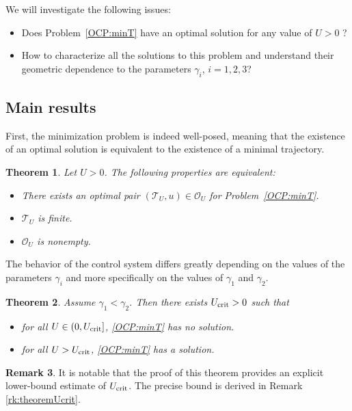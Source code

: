 \documentclass[JEP,XML,SOM,Unicode,NoEqCountersInSection,NoFloatCountersInSection,published]{cedram}
\newtheorem{theorem}{Theorem}
\theoremstyle{definition}
\newtheorem{remark}[theorem]{Remark}
\begin{document}
We will investigate the following issues:
\begin{itemize}
\item Does Problem~\eqref{OCP:minT} have an optimal solution for any value of $U >0$ ?
\item How to characterize all the solutions to this problem and understand their geometric dependence to the parameters $\gamma_i$, $i=1,2,3$?
\end{itemize}

\subsection{Main results}\label{sec:mainRes}

First, the minimization problem is indeed well-posed, meaning that the existence of an optimal solution is equivalent to the existence of a minimal trajectory.

\begin{theorem} \label{th:ex_min}
Let $U > 0$. The following properties are equivalent:
\begin{itemize}
\item[(i)] There exists an optimal pair $(\mathcal{T}_{U}, u) \in \mathcal{O}_{U }$ for Problem~\eqref{OCP:minT}.
\item[(ii)] $\mathcal{T}_{U}$ is finite.
\item[(iii)] $\mathcal{O}_{U }$ is nonempty.
\end{itemize}
\end{theorem}

The behavior of the control system differs greatly depending on the values of the parameters $\gamma_i$ and more specifically on the values of $\gamma_1$ and $\gamma_2$.

\begin{theorem} \label{th:ex_U_crit}
Assume $\gamma_1 < \gamma_2$. Then there exists $U_\textnormal{crit} > 0$ such that
\begin{itemize}
\item for all $U \in (0, U_\textnormal{crit}]$, \eqref{OCP:minT} has no solution.
\item for all $U > U_\textnormal{crit}$, \eqref{OCP:minT} has a solution.
\end{itemize}
\end{theorem}

\begin{remark}
It is notable that the proof of this theorem provides an explicit lower-bound estimate of $U_\textnormal{crit}$. The precise bound is derived in Remark \ref{rk:theoremUcrit}.
\end{remark}
\end{document}
